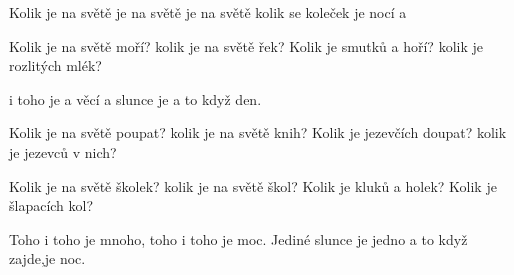 \begin{TEXT}{Kolik je na světě}
\SLOKA {} je na světě  
 je na světě 
kolik se koleček 
 je nocí a 

\SLOKA Kolik je na světě moří?
kolik je na světě řek?
Kolik je smutků a hoří?
kolik je rozlitých mlék?

\REFREN {} i toho je 
 a věcí a 
 slunce je 
a to když   den.

\SLOKA Kolik je na světě poupat?
kolik je na světě knih?
Kolik je jezevčích doupat?
kolik je jezevců v nich?

\SLOKA Kolik je na světě školek?
kolik je na světě škol?
Kolik je kluků a holek?
Kolik je šlapacích kol?

\REFREN Toho i toho je mnoho,
toho i toho je moc.
Jediné slunce je jedno
a to když zajde,je noc.
\end{TEXT}